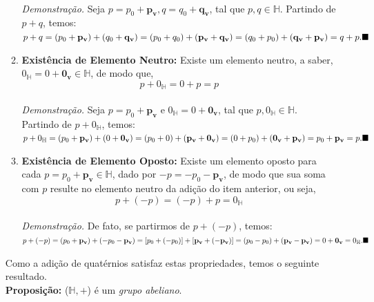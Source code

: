 \documentclass[a4paper,12pt]{report}
\theoremstyle{plain}
\theoremstyle{definition}
\begin{document}
\begin{itemize}
\begin{enumerate}
			\\ \newline \textit{Demonstração.} Seja $p=p_0+\mathbf{p_v}, q=q_0+\mathbf{q_v}$,\,\,tal que $p,q \in \mathbb{H}$. Partindo de $p+q$, temos:
			\\ \newline $p+q=(p_0+\mathbf{p_v})+(q_0+\mathbf{q_v})=(p_0+q_0)+(\mathbf{p_v}+\mathbf{q_v})=(q_0+p_0)+(\mathbf{q_v}+\mathbf{p_v})=q+p.\hfill\blacksquare$
			\\ \item \textbf{Existência de Elemento Neutro:} Existe um elemento neutro, a saber, $0_{\mathbb{H}}=0+\mathbf{0_v} \in \mathbb{H}$, de modo que,
			\begin{equation}
				p+0_{\mathbb{H}}=0+p=p
			\end{equation}
			\\ \textit{Demonstração.}  Seja $p=p_0+\mathbf{p_v} \textrm{ e } 0_{\mathbb{H}}=0+\mathbf{0_v}$,\,\,tal que $p,0_{\mathbb{H}} \in \mathbb{H}$. Partindo de $p+0_{\mathbb{H}}$, temos:
			\\ \newline $p+0_{\mathbb{H}}=(p_0+\mathbf{p_v})+(0+\mathbf{0_v})=(p_0+0)+(\mathbf{p_v}+\mathbf{0_v})=(0+p_0)+(\mathbf{0_v}+\mathbf{p_v})=p_0+\mathbf{p_v}=p.\hfill\blacksquare$
			\\ \item \textbf{Existência de Elemento Oposto:} Existe um elemento oposto para cada $p=p_0+\mathbf{p_v} \in \mathbb{H}$, dado por $-p=-p_0-\mathbf{p_v}$, de modo que sua soma com $p$ resulte no elemento neutro da adição do item anterior, ou seja,
			\begin{equation}
				p+(-p)=(-p)+p=0_{\mathbb{H}}
			\end{equation}
			\\ \textit{Demonstração.} De fato, se partirmos de $p+(-p)$, temos:
			\\ \newline $p+(-p)= (p_0+\mathbf{p_v})+(-p_0-\mathbf{p_v})=[p_0+(-p_0)]+[\mathbf{p_v}+(\mathbf{-p_v})]=(p_0-p_0)+(\mathbf{p_v}-\mathbf{p_v})=0+\mathbf{0_v}=0_{\mathbb{H}}.\hfill\blacksquare$
		\end{enumerate}
		Como a adição de quatérnios satisfaz estas propriedades, temos o seguinte resultado.
		\\ \newline \textbf{Proposição: } ($\mathbb{H},+$) é um \textit{grupo abeliano}.
		\\
		

\end{itemize}
\end{document}
